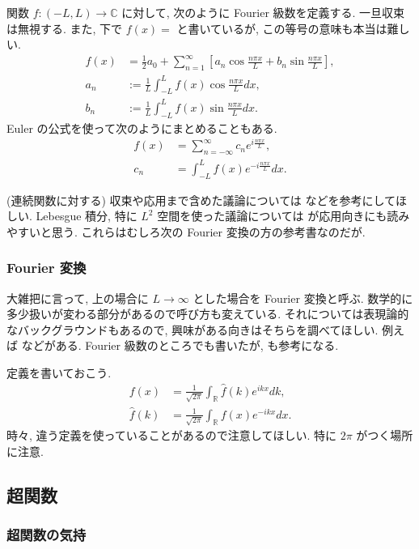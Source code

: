 \documentclass[openany, a4paper, oneside]{jsbook}
\theoremstyle{break}
\theoremstyle{breakdefn}
\begin{document}
関数 $f \colon (-L, L) \to \mathbb{C}$ に対して, 次のように Fourier 級数を定義する.
一旦収束は無視する.
また, 下で $f (x) =$ と書いているが, この等号の意味も本当は難しい.
\begin{align}
 f (x)
 & =
   \frac{1}{2}a_0 + \sum_{n=1}^{\infty}
   \left[ a_n \cos \frac{n \pi x}{L} + b_n \sin \frac{n \pi x}{L} \right], \\
 a_n
 &:=
 \frac{1}{L} \int_{- L}^{L} f (x) \cos \frac{n \pi x}{L} dx, \\
 b_n
 &:=
 \frac{1}{L} \int_{- L}^{L} f (x) \sin \frac{n \pi x}{L} dx.
\end{align}
Euler の公式を使って次のようにまとめることもある.
\begin{align}
 f (x)
 &=
 \sum_{n = - \infty}^{\infty} c_n e^{i \frac{n \pi x}{L}}, \\
 c_n
 &=
 \int_{- L}^{L} f (x) e^{- i \frac{n \pi x}{L}} dx.
\end{align}

(連続関数に対する) 収束や応用まで含めた議論については \cite{KimYamamoto1} などを参考にしてほしい.
Lebesgue 積分, 特に $L^2$ 空間を使った議論については \cite{SeizoIto1, LiebLoss1} が応用向きにも読みやすいと思う.
これらはむしろ次の Fourier 変換の方の参考書なのだが.
\subsubsection{Fourier 変換}


大雑把に言って, 上の場合に $L \to \infty$ とした場合を Fourier 変換と呼ぶ.
数学的に多少扱いが変わる部分があるので呼び方も変えている.
それについては表現論的なバックグラウンドもあるので, 興味がある向きはそちらを調べてほしい.
例えば \cite{KobayashiOshima1} などがある.
Fourier 級数のところでも書いたが, \cite{SeizoIto1, LiebLoss1} も参考になる.

定義を書いておこう.
\begin{align}
 f (x)
 &=
 \frac{1}{\sqrt{2 \pi}} \int_{ \mathbb{R}} \hat{f}(k) e^{ik x} d k, \\
 \hat{f}(k)
 &=
 \frac{1}{\sqrt{2 \pi}}  \int_{\mathbb{R}} f (x) e^{-ik x} dx.
\end{align}
時々, 違う定義を使っていることがあるので注意してほしい.
特に $2 \pi$ がつく場所に注意.
\subsection{超関数}

\subsubsection{超関数の気持}
\end{document}
